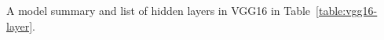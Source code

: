 %
%
%
%
%




\makeappendices
{}
\label{chap:appendix}

\label{sec:vgg16-layers}

A model summary and list of hidden layers in VGG16 in Table~\ref{table:vgg16-layer}.

